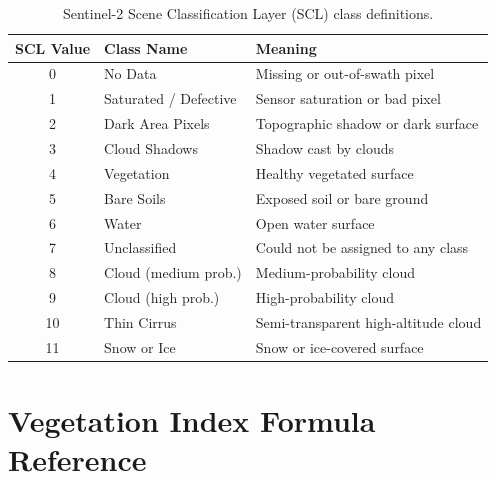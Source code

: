 \begin{table}[H]
\centering
\caption{Sentinel-2 Scene Classification Layer (SCL) class definitions.}
\label{tab:scl}
\begin{tabular}{@{}clp{8cm}@{}}
\toprule
\textbf{SCL Value} & \textbf{Class Name} & \textbf{Meaning} \\
\midrule
0  & No Data              & Missing or out-of-swath pixel \\
1  & Saturated / Defective & Sensor saturation or bad pixel \\
2  & Dark Area Pixels     & Topographic shadow or dark surface \\
3  & Cloud Shadows        & Shadow cast by clouds \\
4  & Vegetation           & Healthy vegetated surface \\
5  & Bare Soils           & Exposed soil or bare ground \\
6  & Water                & Open water surface \\
7  & Unclassified         & Could not be assigned to any class \\
8  & Cloud (medium prob.) & Medium-probability cloud \\
9  & Cloud (high prob.)   & High-probability cloud \\
10 & Thin Cirrus          & Semi-transparent high-altitude cloud \\
11 & Snow or Ice          & Snow or ice-covered surface \\
\bottomrule
\end{tabular}
\end{table}


\section{Vegetation Index Formula Reference}

